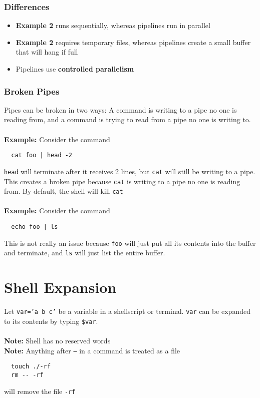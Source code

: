 \documentclass[13pt]{article}
\begin{document}
\subsubsection{Differences}
\begin{itemize}[leftmargin = 0pt]
\item [] \textbf{Example 2} runs sequentially, whereas pipelines run in parallel
\item [] \textbf{Example 2} requires temporary files, whereas pipelines create a small buffer that will hang if full
\item [] Pipelines use \textbf{controlled parallelism}
\end{itemize}
\subsubsection{Broken Pipes}
Pipes can be broken in two ways: A command is writing to a pipe no one is reading from, and a command is trying to read from a pipe no one is writing to. \\ \\
\textbf{Example:} Consider the command
\begin{verbatim}
  cat foo | head -2 \end{verbatim}
\texttt{head} will terminate after it receives 2 lines, but \texttt{cat} will still be writing to a pipe. This creates a broken pipe because \texttt{cat} is writing to a pipe no one is reading from. By default, the shell will kill \texttt{cat} \\ \\
\textbf{Example:} Consider the command
\begin{verbatim}
  echo foo | ls \end{verbatim}
This is not really an issue because \texttt{foo} will just put all its contents into the buffer and terminate, and \texttt{ls} will just list the entire buffer.

\section{Shell Expansion}
Let \texttt{var='a b c'} be a variable in a shellscript or terminal. \texttt{var} can be expanded to its contents by typing \texttt{\$var}. \\ \\
\textbf{Note:} Shell has no reserved words \\
\textbf{Note:} Anything after \texttt{--} in a command is treated as a file
\begin{verbatim}
  touch ./-rf
  rm -- -rf \end{verbatim}
will remove the file \texttt{-rf}
\end{document}
